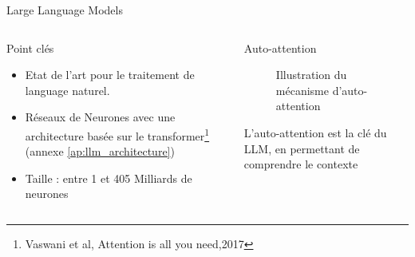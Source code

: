 
\begin{frame}{Large Language Models}
   \begin{columns}
         
       \begin{column}[t]{0.45\textwidth} 
       \begin{block}{Point clés}
           \begin{itemize}
               \item Etat de l'art pour le traitement de language naturel.
               \item Réseaux de Neurones avec une architecture basée sur le  transformer\footnote{Vaswani et al, Attention is all you need,2017 } (annexe \ref{ap:llm_architecture})
               \item Taille : entre 1 et 405 Milliards de neurones
           \end{itemize}
               
       \end{block}
       \end{column}
           
       \begin{column}[t]{0.5\textwidth}
       \begin{block}{Auto-attention}
           \begin{figure}
               \centering
               
               \caption{Illustration du mécanisme d'auto-attention}
           \end{figure}    
           L'auto-attention est la clé du LLM, en permettant de comprendre le contexte
       \end{block}  
       \end{column}
            
   \end{columns}
   \end{frame}


